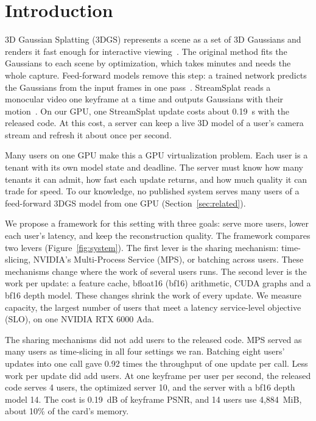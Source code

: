 \section{Introduction}
\label{sec:intro}

3D Gaussian Splatting (3DGS) represents a scene as a set of 3D Gaussians and renders it fast enough for interactive viewing~\cite{kerbl2023gaussian}.
The original method fits the Gaussians to each scene by optimization, which takes minutes and needs the whole capture.
Feed-forward models remove this step: a trained network predicts the Gaussians from the input frames in one pass~\cite{anysplat2025,streamsplat2026}.
StreamSplat reads a monocular video one keyframe at a time and outputs Gaussians with their motion~\cite{streamsplat2026}.
On our GPU, one StreamSplat update costs about 0.19~s with the released code. %
At this cost, a server can keep a live 3D model of a user's camera stream and refresh it about once per second. %

Many users on one GPU make this a GPU virtualization problem.
Each user is a tenant with its own model state and deadline.
The server must know how many tenants it can admit, how fast each update returns, and how much quality it can trade for speed.
To our knowledge, no published system serves many users of a feed-forward 3DGS model from one GPU (Section~\ref{sec:related}).

We propose a framework for this setting with three goals: serve more users, lower each user's latency, and keep the reconstruction quality.
The framework compares two levers (Figure~\ref{fig:system}).
The first lever is the sharing mechanism: time-slicing, NVIDIA's Multi-Process Service (MPS), or batching across users.
These mechanisms change where the work of several users runs.
The second lever is the work per update: a feature cache, bfloat16 (bf16) arithmetic, CUDA graphs and a bf16 depth model.
These changes shrink the work of every update.
We measure capacity, the largest number of users that meet a latency service-level objective (SLO), on one NVIDIA RTX 6000 Ada.

The sharing mechanisms did not add users to the released code.
MPS served as many users as time-slicing in all four settings we ran. %
Batching eight users' updates into one call gave 0.92 times the throughput of one update per call. %
Less work per update did add users.
At one keyframe per user per second, the released code serves 4 users, the optimized server 10, and the server with a bf16 depth model 14. %
The cost is 0.19~dB of keyframe PSNR, and 14 users use 4,884~MiB, about 10\% of the card's memory. %

